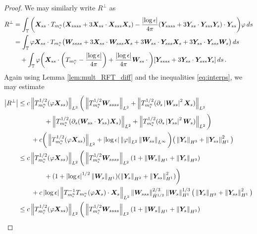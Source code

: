 \documentclass[10pt,a4paper]{amsart}
\newcommand{\T}{\mathbb{T}}
\newcommand{\X}{\bm{X}}
\newcommand{\Y}{\bm{Y}}
\newcommand{\abs}[1]{\left\lvert #1 \right\rvert}
\newcommand{\norm}[1]{\left\lVert #1 \right\rVert}
\newcommand{\p}{\partial}
\begin{document}
\begin{proof}
We may similarly write $R^\perp$ as 
\begin{equation}
\begin{aligned}
  R^\perp &= \int_\T \bigg(\X_{ss}\cdot T_{m_\epsilon^{\rm n}}(\X_{ssss}+3\X_{ss}\cdot\X_{sss}\X_s) - \frac{\abs{\log\epsilon}}{4\pi}(\Y_{ssss}+3\Y_{ss}\cdot\Y_{sss}\Y_s)\cdot\Y_{ss} \bigg)\varphi\,ds \\
  &= \int_\T \varphi\X_{ss}\cdot T_{m_\epsilon^{\rm n}}\big(\bm{W}_{ssss}+3\X_{ss}\cdot\bm{W}_{sss}\X_s +3\bm{W}_{ss}\cdot\Y_{sss}\X_s +3\Y_{ss}\cdot\Y_{sss}\bm{W}_s\big)\,ds\\
  &\quad +\int_\T \varphi\bigg(\X_{ss}\cdot\bigg(T_{m_\epsilon^{\rm n}}-\frac{\abs{\log\epsilon}}{4\pi}\bigg)+ \frac{\abs{\log\epsilon}}{4\pi}\bm{W}_{ss}\cdot \bigg)[\Y_{ssss}+3\Y_{ss}\cdot\Y_{sss}\Y_s] \,ds\,.
\end{aligned}
\end{equation}
%
%
Again using Lemma \ref{lem:mult_RFT_diff} and the inequalities \eqref{eq:interps}, we may estimate 
\begin{equation}
\begin{aligned}
  \abs{R^\perp} &\le c\norm{T_{m_\epsilon^{\rm n}}^{1/2}(\varphi\X_{ss})}_{L^2}\bigg(\norm{T_{m_\epsilon^{\rm n}}^{1/2}\bm{W}_{ssss}}_{L^2}+\norm{T_{m_\epsilon^{\rm n}}^{1/2}(\p_s\abs{\bm{W}_{ss}}^2\X_s)}_{L^2}\\
  &\qquad\qquad  +\norm{T_{m_\epsilon^{\rm n}}^{1/2}(\p_s(\bm{W}_{ss}\cdot\Y_{ss})\X_s)}_{L^2} +\norm{T_{m_\epsilon^{\rm n}}^{1/2}(\p_s\abs{\Y_{ss}}^2\bm{W}_s)}_{L^2}\bigg) \\
  &\qquad +c\bigg(\norm{T_{m_\epsilon^{\rm n}}^{1/2}(\varphi\X_{ss})}_{L^2}+ \abs{\log\epsilon}\norm{\varphi}_{L^2}\norm{\bm{W}_{ss}}_{L^\infty}\bigg)\big( \norm{\Y_s}_{H^3}+ \norm{\Y_{ss}}_{H^1}^2\big) \\
  &\le c\norm{T_{m_\epsilon^{\rm n}}^{1/2}(\varphi\X_{ss})}_{L^2}\bigg(\norm{T_{m_\epsilon^{\rm n}}^{1/2}\bm{W}_{ssss}}_{L^2}(1+\norm{\bm{W}_s}_{H^1}+\norm{\Y_s}_{H^3}) \\
  &\qquad\qquad +(1+\abs{\log\epsilon}^{1/2}\norm{\bm{W}_s}_{H^1})(\norm{\Y_s}_{H^3}+\norm{\Y_{ss}}_{H^1}^2) \bigg) \\
  &\qquad + c\abs{\log\epsilon}\norm{T_{m_\epsilon^{\rm n}}^{-1}T_{m_\epsilon^{\rm n}}(\varphi\X_s)\cdot\X_s}_{L^2}\norm{\bm{W}_{sss}}_{\dot H^{1/2}}^{2/3}\norm{\bm{W}_s}_{H^1}^{1/3}\big( \norm{\Y_s}_{H^3}+ \norm{\Y_{ss}}_{H^1}^2\big)\\
   &\le c\norm{T_{m_\epsilon^{\rm n}}^{1/2}(\varphi\X_{ss})}_{L^2}\bigg(\norm{T_{m_\epsilon^{\rm n}}^{1/2}\bm{W}_{ssss}}_{L^2}(1+\norm{\bm{W}_s}_{H^1}+\norm{\Y_s}_{H^3}) \\

\end{aligned}
\end{equation}
\end{proof}
\end{document}
